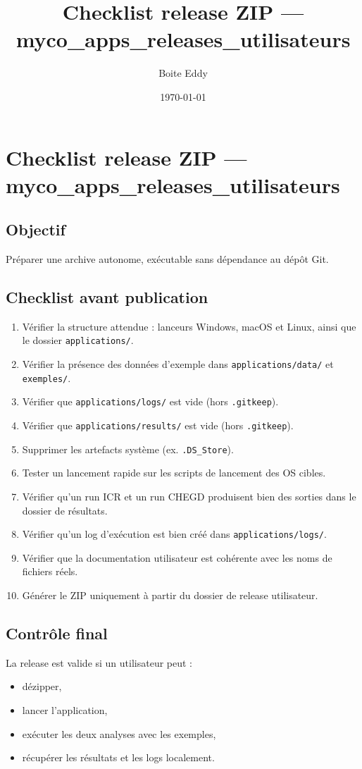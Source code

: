 \documentclass[11pt,a4paper]{article}
\title{Checklist release ZIP --- myco\_apps\_releases\_utilisateurs}
\author{Boite Eddy}
\date{\today}
\begin{document}
\maketitle
\section{Checklist release ZIP --- myco\_apps\_releases\_utilisateurs}

\subsection{Objectif}

Préparer une archive autonome, exécutable sans dépendance au dépôt Git.

\subsection{Checklist avant publication}

\begin{enumerate}
\item Vérifier la structure attendue : lanceurs Windows, macOS et Linux, ainsi que le dossier \texttt{applications/}.
\item Vérifier la présence des données d'exemple dans \texttt{applications/data/} et \texttt{exemples/}.
\item Vérifier que \texttt{applications/logs/} est vide (hors \texttt{.gitkeep}).
\item Vérifier que \texttt{applications/results/} est vide (hors \texttt{.gitkeep}).
\item Supprimer les artefacts système (ex. \texttt{.DS\_Store}).
\item Tester un lancement rapide sur les scripts de lancement des OS cibles.
\item Vérifier qu'un run ICR et un run CHEGD produisent bien des sorties dans le dossier de résultats.
\item Vérifier qu'un log d'exécution est bien créé dans \texttt{applications/logs/}.
\item Vérifier que la documentation utilisateur est cohérente avec les noms de fichiers réels.
\item Générer le ZIP uniquement à partir du dossier de release utilisateur.
\end{enumerate}

\subsection{Contrôle final}

La release est valide si un utilisateur peut :
\begin{itemize}
\item dézipper,
\item lancer l'application,
\item exécuter les deux analyses avec les exemples,
\item récupérer les résultats et les logs localement.
\end{itemize}
\end{document}
